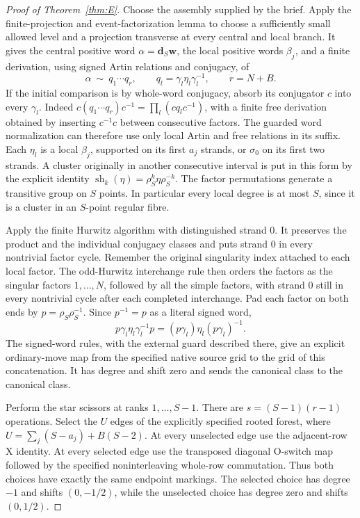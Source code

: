 \documentclass[11pt,a4paper]{article}
\theoremstyle{remark}
\begin{document}
\begin{proof}[Proof of Theorem~\ref{thm:E}]
Choose the assembly supplied by the brief.  Apply the finite-projection
and event-factorization lemma to choose a sufficiently small allowed
level and a projection transverse at every central and local branch.
It gives the central positive word
$\alpha=\mathbf d_S\mathbf w$, the local positive words $\beta_j$,
and a finite derivation, using signed Artin relations and conjugacy,
of
\[
 \alpha\ \sim\ q_1\cdots q_r,\qquad
 q_l=\gamma_l\eta_l\gamma_l^{-1},\qquad r=N+B.
\]
If the initial comparison is by whole-word conjugacy, absorb its
conjugator $c$ into every $\gamma_l$.  Indeed
$c(q_1\cdots q_r)c^{-1}=\prod_l(cq_lc^{-1})$, with a finite free
derivation obtained by inserting $c^{-1}c$ between consecutive
factors.  The guarded word normalization can therefore use only
local Artin and free relations in its suffix.
Each $\eta_l$ is a local $\beta_j$, supported on its first $a_j$
strands, or $\sigma_0$ on its first two strands.  A cluster originally
in another consecutive interval is put in this form by the explicit
identity $\operatorname{sh}_k(\eta)=\rho_S^k\eta\rho_S^{-k}$.
The factor permutations generate a transitive group on $S$ points.
In particular every local degree is at most $S$, since it is a
cluster in an $S$-point regular fibre.

Apply the finite Hurwitz algorithm with distinguished strand $0$.
It preserves the product and the individual conjugacy classes and
puts strand $0$ in every nontrivial factor cycle.  Remember the
original singularity index attached to each local factor.  The
odd-Hurwitz interchange rule then orders the factors as the singular
factors $1,\ldots,N$, followed by all the simple factors, with strand
$0$ still in every nontrivial cycle after each completed interchange.
Pad each
factor on both ends by
$p=\rho_S\rho_S^{-1}$.  Since $p^{-1}=p$ as a literal signed word,
\[
 p\gamma_l\eta_l\gamma_l^{-1}p
       =(p\gamma_l)\eta_l(p\gamma_l)^{-1}.
\]
The signed-word rules, with the external guard described there,
give an explicit ordinary-move map from the specified native source
grid to the grid of this concatenation.  It has degree and shift zero
and sends the canonical class to the canonical class.

Perform the star scissors at ranks $1,\ldots,S-1$.  There are
$s=(S-1)(r-1)$ operations.  Select the $U$ edges of the explicitly
specified rooted forest, where
$U=\sum_j(S-a_j)+B(S-2)$.  At every unselected edge use the
adjacent-row X identity.  At every selected edge use the transposed
diagonal O-switch map followed by the specified noninterleaving
whole-row commutation.  Thus both choices have exactly the same
endpoint markings.  The selected choice has degree $-1$ and shifts
$(0,-1/2)$, while the unselected choice has degree zero and shifts
$(0,1/2)$.


\end{proof}
\end{document}
